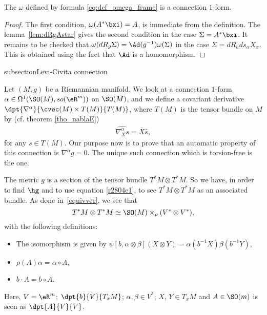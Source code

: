 \begin{proposition}
	The $\omega$ defined by formula \eqref{eq:def_omega_frame} is a connection $1$-form.
	\label{prop_omconfrom}
\end{proposition}

\begin{proof}
	The first condition, $\omega(A^*\bxi)=A$, is immediate from the definition. The lemma~\ref{lem:dRgAstar} gives the second condition in the case $\Sigma=A^*\bxi$. It remains to be checked that $\omega(dR_g\Sigma)=\Ad(g^{-1})\omega(\Sigma)$ in the case $\Sigma=dR_hds_{\alpha} X_x$. This is obtained using the fact that $\Ad$ is a homomorphism.
\end{proof}

subsection{Levi-Civita connection}\label{subsection_levi}

Let $(M,g)$ be a Riemannian manifold. We look at a connection $1$-form $\alpha\in\Omega^1(\SO(M),so(\eR^m))$ on $\SO(M)$, and we define a covariant derivative $\dpt{\nabla^{\alpha}}{\cvec(M)\times T(M)}{T(M)}$, where $T(M)$ is the tensor bundle on $M$ by (cf. theorem \eqref{tho_nablaE})
\begin{eqnarray}\label{r2804e1}
	\widehat{\nabla^{\alpha}_X s}=\overline{X}\hat{s},
\end{eqnarray}
for any $s\in T(M)$.  Our purpose now is to prove that an automatic property of this connection is $\nabla^{\alpha} g=0$. The unique such connection which is torsion-free is the  one.

The metric $g$ is a section of the tensor bundle $T^*M\otimes T^*M$. So we have, in order to find $\hg$ and to use equation \eqref{r2804e1}, to see $T^*M\otimes T^*M$ as an associated bundle. As done in~\ref{equivvec}, we see that
\[
	T^*M\otimes T^*M\simeq \SO(M)\times_{\rho}(V^*\otimes V^*),
\]
with the following definitions:
\begin{itemize}
	\item The isomorphism is given by $\psi[b,\alpha\otimes\beta](X\otimes Y)=\alpha(b^{-1} X)\beta(b^{-1} Y)$,
	\item $\rho(A)\alpha=\alpha\circ A$,
	\item $b\cdot A=b\circ A$.
\end{itemize}
Here, $V=\eR^m$; $\dpt{b}{V}{T_xM}$; $\alpha,\beta\in V^*$; $X$, $Y\in T_xM$ and $A\in \SO(m)$ is seen as $\dpt{A}{V}{V}$.

